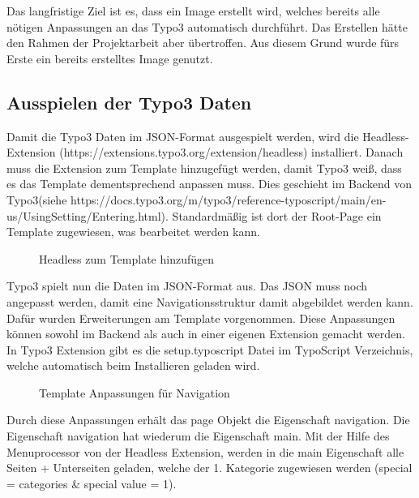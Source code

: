 Das langfristige Ziel ist es, dass ein Image erstellt wird, welches bereits alle nötigen Anpassungen an das Typo3 automatisch durchführt. Das Erstellen hätte den Rahmen der Projektarbeit aber übertroffen. Aus diesem Grund wurde fürs Erste ein bereits erstelltes Image genutzt.

\subsection{Ausspielen der Typo3 Daten}
\label{sec:Ausspielen der Typo3 Daten}

Damit die Typo3 Daten im JSON-Format ausgespielt werden, wird die Headless-Extension \linebreak (https://extensions.typo3.org/extension/headless) installiert. Danach muss die Extension zum Template hinzugefügt werden, damit Typo3 weiß, dass es das Template dementsprechend anpassen muss. Dies geschieht im Backend von Typo3(siehe https://docs.typo3.org/m/typo3/reference-typoscript/main/en-us/UsingSetting/Entering.html). Standardmäßig ist dort der Root-Page ein Template zugewiesen, was bearbeitet werden kann.

\begin{figure}[htb]
\centering
{}
\caption{Headless zum Template hinzufügen}
\label{fig:Headless zum Template hinzufügen}
\end{figure}

Typo3 spielt nun die Daten im JSON-Format aus. Das JSON muss noch angepasst werden, damit eine Navigationsstruktur damit abgebildet werden kann. Dafür wurden Erweiterungen am Template vorgenommen. Diese Anpassungen können sowohl im Backend als auch in einer eigenen Extension gemacht werden. In Typo3 Extension gibt es die setup.typoscript Datei im TypoScript Verzeichnis, welche automatisch beim Installieren geladen wird. 

\begin{figure}[htb]
\centering
{}
\caption{Template Anpassungen für Navigation}
\label{fig:Template Anpassungen für Navigation}
\end{figure}


Durch diese Anpassungen erhält das page Objekt die Eigenschaft navigation. Die Eigenschaft navigation hat wiederum die Eigenschaft main. Mit der Hilfe des Menuprocessor von der Headless Extension, werden in die main Eigenschaft alle Seiten + Unterseiten geladen, welche der 1. Kategorie zugewiesen werden (special = categories \& special value = 1). 

